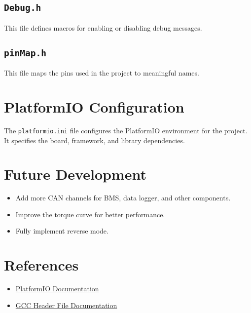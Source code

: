 \documentclass[a4paper,12pt]{article}
\begin{document}




\subsection{\texttt{Debug.h}}
This file defines macros for enabling or disabling debug messages.



\subsection{\texttt{pinMap.h}}
This file maps the pins used in the project to meaningful names.



\section{PlatformIO Configuration}
The \texttt{platformio.ini} file configures the PlatformIO environment for the project. It specifies the board, framework, and library dependencies.



\section{Future Development}
\begin{itemize}
    \item Add more CAN channels for BMS, data logger, and other components.
    \item Improve the torque curve for better performance.
    \item Fully implement reverse mode.
\end{itemize}

\section{References}
\begin{itemize}
    \item \href{https://docs.platformio.org/en/latest/}{PlatformIO Documentation}
    \item \href{https://gcc.gnu.org/onlinedocs/cpp/Header-Files.html}{GCC Header File Documentation}
\end{itemize}
\end{document}
